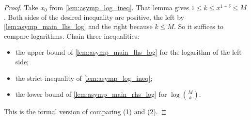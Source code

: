 \documentclass[11pt]{article}
\theoremstyle{definition}
\theoremstyle{remark}
\begin{document}
\begin{proof}
Take $x_0$ from \cref{lem:asymp_log_ineq}. That lemma gives $1\le k\le x^{1-\delta}\le M$. Both sides of the desired inequality are positive, the left by \cref{lem:asymp_main_lhs_log} and the right because $k\le M$. So it suffices to compare logarithms. Chain three inequalities:
\begin{itemize}
\item the upper bound of \cref{lem:asymp_main_lhs_log} for the logarithm of the left side;
\item the strict inequality of \cref{lem:asymp_log_ineq};
\item the lower bound of \cref{lem:asymp_main_rhs_log} for $\log\binom Mk$.
\end{itemize}
This is the formal version of comparing (1) and (2).
\end{proof}
\end{document}
